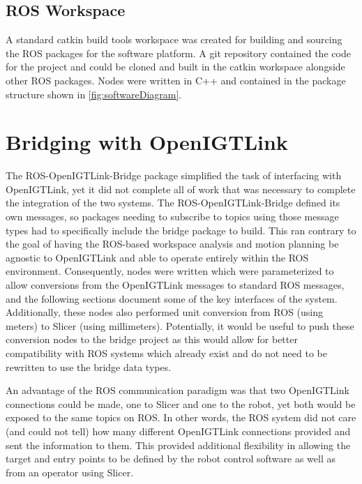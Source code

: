 \documentclass[12pt]{report}
\makeatletter
\renewcommand{\todo}[2][]{%
    \@todo[caption={#2}, #1]{\begin{spacing}{0.5}#2\end{spacing}}%
}
\makeatother
\begin{document}
\subsection{ROS Workspace}
A standard catkin build tools workspace was created for building and sourcing the ROS packages for the software platform. A git repository contained the code for the project and could be cloned and built in the catkin workspace alongside other ROS packages. Nodes were written in C++ and contained in the package structure shown in \autoref{fig:softwareDiagram}.




\section{Bridging with OpenIGTLink}
The ROS-OpenIGTLink-Bridge package simplified the task of interfacing with OpenIGTLink, yet it did not complete all of work that was necessary to complete the integration of the two systems. The ROS-OpenIGTLink-Bridge defined its own messages, so packages needing to subscribe to topics using those message types had to specifically include the bridge package to build. This ran contrary to the goal of having the ROS-based workspace analysis and motion planning be agnostic to OpenIGTLink and able to operate entirely within the ROS environment. Consequently, nodes were written which were parameterized to allow conversions from the OpenIGTLink messages to standard ROS messages, and the following sections document some of the key interfaces of the system. Additionally, these nodes also performed unit conversion from ROS (using meters) to Slicer (using millimeters). Potentially, it would be useful to push these conversion nodes to the bridge project as this would allow for better compatibility with ROS systems which already exist and do not need to be rewritten to use the bridge data types.

An advantage of the ROS communication paradigm was that two OpenIGTLink connections could be made, one to Slicer and one to the robot, yet both would be exposed to the same topics on ROS. In other words, the ROS system did not care (and could not tell) how many different OpenIGTLink connections provided and sent the information to them. This provided additional flexibility in allowing the target and entry points to be defined by the robot control software as well as from an operator using Slicer.
\end{document}
